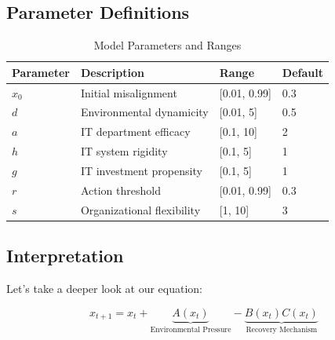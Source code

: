 \documentclass[a4paper, 12pt]{article}
\begin{document}
\subsection{Parameter Definitions}
\begin{table}[h]
	\centering
	\caption{Model Parameters and Ranges}
	\begin{tabular}{llll}
		\toprule
		\textbf{Parameter} & \textbf{Description}       & \textbf{Range} & \textbf{Default} \\
		\midrule
		$x_0$              & Initial misalignment       & [0.01, 0.99]   & 0.3              \\
		$d$                & Environmental dynamicity   & [0.01, 5]      & 0.5              \\
		$a$                & IT department efficacy     & [0.1, 10]      & 2                \\
		$h$                & IT system rigidity         & [0.1, 5]       & 1                \\
		$g$                & IT investment propensity   & [0.1, 5]       & 1                \\
		$r$                & Action threshold           & [0.01, 0.99]   & 0.3              \\
		$s$                & Organizational flexibility & [1, 10]        & 3                \\
		\bottomrule
	\end{tabular}
\end{table}

\subsection{Interpretation}
Let's take a deeper look at our equation:

\begin{equation}
	x_{t + 1} = x_t + \underbrace{A(x_t)}_{\text{Environmental Pressure}} - \underbrace{B(x_t)C(x_t)}_{\text{Recovery Mechanism}}
\end{equation}
\end{document}

